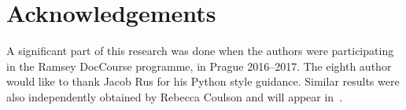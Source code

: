 \documentclass[11pt]{amsart}
\begin{document}
\section{Acknowledgements}
A significant part of this research was done when the authors were participating in the Ramsey DocCourse programme, in Prague 2016--2017. The eighth author would like to thank Jacob Rus for his Python style guidance.
Similar results were also independently obtained by Rebecca Coulson and will appear
in~\cite{Coulson}.


\end{document}
